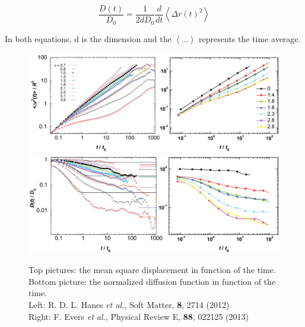 \documentclass[a4paper,12pt]{article}
\newcommand{\etal}{\textit{et al.}}
\begin{document}
\begin{equation}
\frac{D(t)}{D_0}=\frac{1}{2dD_0}\frac{d}{dt}\left< \Delta r(t)^2 \right>
\end{equation}

In both equations, d is the dimension and the $\left< \hdots \right>$ represents the time average.

\begin{figure}[htbp]
\centering
\subfigure
{\includegraphics[width=14cm]{pics/msd_exp.png}}
\subfigure
{\includegraphics[width=14cm]{pics/ndc_exp.png}}
\caption{Top pictures: the mean square displacement in function of the time. Bottom picture: the normalized diffusion function in function of
the time.
\\ Left: \small R. D. L. Hanes \etal, Soft Matter, \textbf{8}, 2714 (2012)\\ \normalfont Right: \small F. Evers \etal, Physical Review E,
\textbf{88}, 022125 (2013)}
\label{msd ndc exp}
\end{figure}
\end{document}
